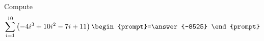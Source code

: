 \documentclass{ximera}
\author{Gregory Hartman \and Matthew Carr}
\begin{document}
\begin{exercise}



Compute
\[
\sum_{i=1}^{10}\left(-4i^3+10i^2-7i+11\right)\begin{prompt}=\answer{-8525}
\end{prompt}
\]

\end{exercise}
\end{document}
